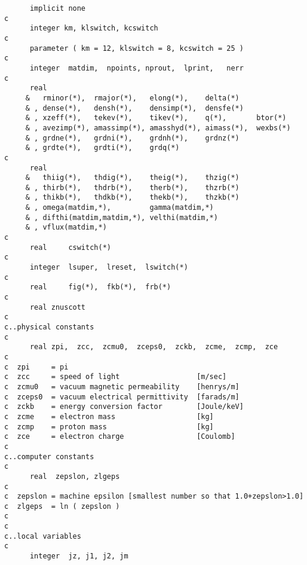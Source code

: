 \begin{verbatim}
      implicit none
c
      integer km, klswitch, kcswitch
c
      parameter ( km = 12, klswitch = 8, kcswitch = 25 )
c
      integer  matdim,  npoints, nprout,  lprint,   nerr
c
      real
     &   rminor(*),  rmajor(*),   elong(*),    delta(*)
     & , dense(*),   densh(*),    densimp(*),  densfe(*)
     & , xzeff(*),   tekev(*),    tikev(*),    q(*),       btor(*)
     & , avezimp(*), amassimp(*), amasshyd(*), aimass(*),  wexbs(*)
     & , grdne(*),   grdni(*),    grdnh(*),    grdnz(*)
     & , grdte(*),   grdti(*),    grdq(*)
c
      real  
     &   thiig(*),   thdig(*),    theig(*),    thzig(*)
     & , thirb(*),   thdrb(*),    therb(*),    thzrb(*)
     & , thikb(*),   thdkb(*),    thekb(*),    thzkb(*)
     & , omega(matdim,*),         gamma(matdim,*)
     & , difthi(matdim,matdim,*), velthi(matdim,*)
     & , vflux(matdim,*)
c
      real     cswitch(*)
c
      integer  lsuper,  lreset,  lswitch(*)
c
      real     fig(*),  fkb(*),  frb(*)
c
      real znuscott
c
c..physical constants
c
      real zpi,  zcc,  zcmu0,  zceps0,  zckb,  zcme,  zcmp,  zce
c
c  zpi     = pi
c  zcc     = speed of light                  [m/sec]
c  zcmu0   = vacuum magnetic permeability    [henrys/m]
c  zceps0  = vacuum electrical permittivity  [farads/m]
c  zckb    = energy conversion factor        [Joule/keV]
c  zcme    = electron mass                   [kg]
c  zcmp    = proton mass                     [kg]
c  zce     = electron charge                 [Coulomb]
c
c..computer constants
c
      real  zepslon, zlgeps
c
c  zepslon = machine epsilon [smallest number so that 1.0+zepslon>1.0]
c  zlgeps  = ln ( zepslon )
c
c
c..local variables
c
      integer  jz, j1, j2, jm


\end{verbatim}
